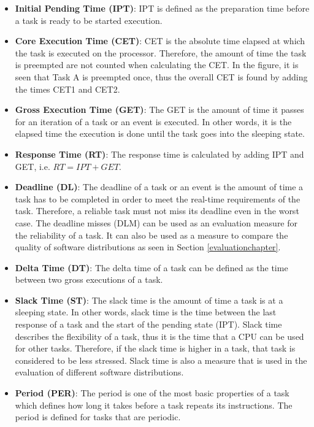 \begin{itemize}
	\item \textbf{Initial Pending Time (IPT)}: IPT is defined as the preparation time before a task is ready to be started execution.
	\item \textbf{Core Execution Time (CET)}: CET is the absolute time elapsed at which the task is executed on the processor. Therefore, the amount of time the task is preempted are not counted when calculating the CET. In the figure, it is seen that Task A is preempted once, thus the overall CET is found by adding the times CET1 and CET2.
	\item \textbf{Gross Execution Time (GET)}: The GET is the amount of time it passes for an iteration of a task or an event is executed. In other words, it is the elapsed time the execution is done until the task goes into the sleeping state.
	\item \textbf{Response Time (RT)}: The response time is calculated by adding IPT and GET, i.e. $RT = {IPT + GET}$.
	\item \textbf{Deadline (DL)}: The deadline of a task or an event is the amount of time a task has to be completed in order to meet the real-time requirements of the task. Therefore, a reliable task must not miss its deadline even in the worst case. The deadline misses (DLM) can be used as an evaluation measure for the reliability of a task. It can also be used as a measure to compare the quality of software distributions as seen in Section \ref{evaluationchapter}.
	\item \textbf{Delta Time (DT)}: The delta time of a task can be defined as the time between two gross executions of a task.
	\item \textbf{Slack Time (ST)}: The slack time is the amount of time a task is at a sleeping state. In other words, slack time is the time between the last response of a task and the start of the pending state (IPT). Slack time describes the flexibility of a task, thus it is the time that a CPU can be used for other tasks. Therefore, if the slack time is higher in a task, that task is considered to be less stressed. Slack time is also a measure that is used in the evaluation of different software distributions. 
	\item \textbf{Period (PER)}: The period is one of the most basic properties of a task which defines how long it takes before a task repeats its instructions. The period is defined for tasks that are periodic.
\end{itemize}

